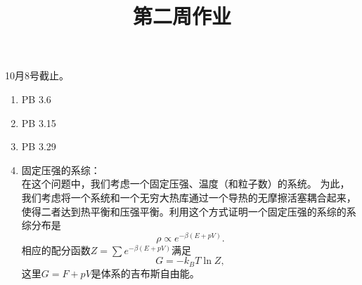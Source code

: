\documentclass[12pt,aps,pra,notitlepage]{revtex4-1}
\begin{document}
\title{第二周作业}
\maketitle
\begin{center}
  10月8号截止。
\end{center}
\begin{enumerate}
  \item PB 3.6
  \item PB 3.15
  \item PB 3.29
  \item 固定压强的系综：\\
  在这个问题中，我们考虑一个固定压强、温度（和粒子数）的系统。
  为此，我们考虑将一个系统和一个无穷大热库通过一个导热的无摩擦活塞耦合起来，使得二者达到热平衡和压强平衡。利用这个方式证明一个固定压强的系综的系综分布是
  \[\rho \propto e^{-\beta(E+pV)}.\]
  相应的配分函数$Z=\sum e^{-\beta(E+pV)}$满足
  \[G=-k_BT\ln Z,\]
  这里$G=F+pV$是体系的吉布斯自由能。
\end{enumerate}
\end{document}
